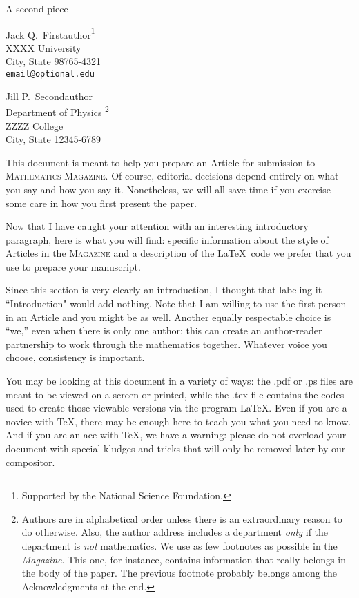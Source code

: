 \documentclass[12pt]{article}
\begin{document}
\begin{center}
\Large
A second piece
\end{center}

\begin{flushright}
Jack Q.~Firstauthor\footnote{Supported by the National Science
Foundation.}  \\
XXXX University \\
City, State 98765-4321\\
\verb+email@optional.edu+

\vspace{2 mm}

Jill P.~Secondauthor \\
Department of Physics
\footnote{Authors are in alphabetical order
unless there is an extraordinary reason to do otherwise.  Also,
the author address includes a department \emph{only} if
the department is \emph{not} mathematics. We use as few
footnotes as possible in the \textit{Magazine}.  This one, for instance,
contains information that really belongs in the body of the paper.
The previous footnote probably belongs among the Acknowledgments at the end.}\\
ZZZZ College \\
City, State 12345-6789
\end{flushright}

This document is meant to help you prepare an Article for
submission to \textsc{Mathematics Magazine}.  Of course,
editorial decisions depend entirely on
what you say and how you say it. Nonetheless, we will all save
time if you exercise some care in how you first present the paper.

Now that I have caught your attention with an interesting introductory paragraph,
here is what you will find:
specific information about the style of Articles in the \textsc{Magazine}
and a description of the \LaTeX\ code we prefer that you use
to prepare your manuscript.

Since this section is very clearly
an introduction, I thought that labeling it ``Introduction" would add
nothing.  Note that I am willing to use the first person in an Article
and you might be as well.  Another equally respectable choice is ``we,''
even when there is only one author; this can
create an author-reader partnership to
work through the mathematics together.
Whatever voice you choose, consistency is important.

You may be looking at this document in a variety of ways:  the .pdf or .ps files
are meant to be viewed on a screen or printed, while
the .tex file contains the codes used to create those
viewable versions via the program \LaTeX.  Even if you are a novice with \TeX,
there may be enough here to teach you what
you need to know.  And if you are an ace with \TeX,
we have a warning: please do not overload your
document with special kludges and tricks that will
only be removed later by our compositor.
\end{document}
